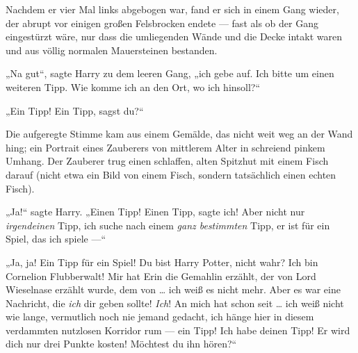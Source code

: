 Nachdem er vier Mal links abgebogen war, fand er sich in einem Gang wieder, der abrupt vor einigen großen Felsbrocken endete — fast als ob der Gang eingestürzt wäre, nur dass die umliegenden Wände und die Decke intakt waren und aus völlig normalen Mauersteinen bestanden.

„Na gut“, sagte Harry zu dem leeren Gang, „ich gebe auf. Ich bitte um einen weiteren Tipp. Wie komme ich an den Ort, wo ich hinsoll?“

„Ein Tipp! Ein Tipp, sagst du?“

Die aufgeregte Stimme kam aus einem Gemälde, das nicht weit weg an der Wand hing; ein Portrait eines Zauberers von mittlerem Alter in schreiend pinkem Umhang. Der Zauberer trug einen schlaffen, alten Spitzhut mit einem Fisch darauf (nicht etwa ein Bild von einem Fisch, sondern tatsächlich einen echten Fisch).

„Ja!“ sagte Harry.
„Einen Tipp! Einen Tipp, sagte ich! Aber nicht nur \emph{irgendeinen} Tipp, ich suche nach einem \emph{ganz bestimmten} Tipp, er ist für ein Spiel, das ich spiele —“

„Ja, ja! Ein Tipp für ein Spiel! Du bist Harry Potter, nicht wahr? Ich bin Cornelion Flubberwalt! Mir hat Erin die Gemahlin erzählt, der von Lord Wieselnase erzählt wurde, dem von … ich weiß es nicht mehr. Aber es war eine Nachricht, die \emph{ich} dir geben sollte! \emph{Ich}! An mich hat schon seit … ich weiß nicht wie lange, vermutlich noch nie jemand gedacht, ich hänge hier in diesem verdammten nutzlosen Korridor rum — ein Tipp! Ich habe deinen Tipp! Er wird dich nur drei Punkte kosten! Möchtest du ihn hören?“

